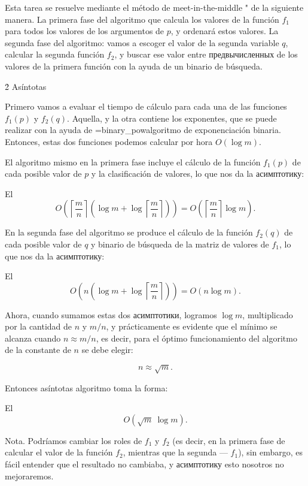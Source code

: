 Esta tarea se resuelve mediante el método de meet-in-the-middle " de la siguiente manera. La primera fase del algoritmo que calcula los valores de la función $f_1$ para todos los valores de los argumentos de $p$, y ordenará estos valores. La segunda fase del algoritmo: vamos a escoger el valor de la segunda variable $q$, calcular la segunda función $f_2$, y buscar ese valor entre предвычисленных de los valores de la primera función con la ayuda de un binario de búsqueda.


\h2{ Asíntotas }

Primero vamos a evaluar el tiempo de cálculo para cada una de las funciones $f_1(p)$ y $f_2(q)$. Aquella, y la otra contiene los exponentes, que se puede realizar con la ayuda de \algohref=binary_pow{algoritmo de exponenciación binaria}. Entonces, estas dos funciones podemos calcular por hora $O(\log m)$.

El algoritmo mismo en la primera fase incluye el cálculo de la función $f_1(p)$ de cada posible valor de $p$ y la clasificación de valores, lo que nos da la асимптотику:

El $$ O\left( \left\lceil \frac{m}{n} \right\rceil \left( \log m + \log \left\lceil \frac{m}{n} \right\rceil \right) \right) = O\left( \left\lceil \frac{m}{n} \right\rceil \log m \right). $$

En la segunda fase del algoritmo se produce el cálculo de la función $f_2(q)$ de cada posible valor de $q$ y binario de búsqueda de la matriz de valores de $f_1$, lo que nos da la асимптотику:

El $$ O\left( n \left( \log m + \log \left\lceil \frac{m}{n} \right\rceil \right) \right) = O\left( n \log m \right). $$

Ahora, cuando sumamos estas dos асимптотики, logramos $\log m$, multiplicado por la cantidad de $n$ y $m/n$, y prácticamente es evidente que el mínimo se alcanza cuando $n \approx m/n$, es decir, para el óptimo funcionamiento del algoritmo de la constante de $n$ se debe elegir:

$$ n \approx \sqrt{m}. $$

Entonces asíntotas algoritmo toma la forma:

El $$ O\left( \sqrt{m} ~ \log m \right). $$

Nota. Podríamos cambiar los roles de $f_1$ y $f_2$ (es decir, en la primera fase de calcular el valor de la función $f_2$, mientras que la segunda --- $f_1$), sin embargo, es fácil entender que el resultado no cambiaba, y асимптотику esto nosotros no mejoraremos.


